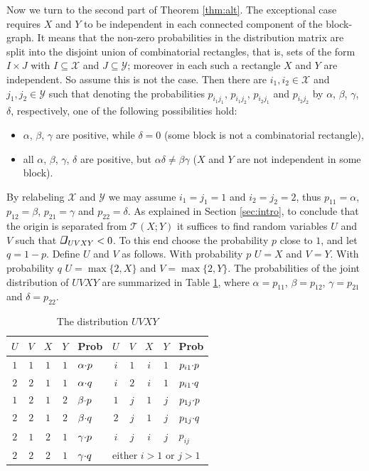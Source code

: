 \documentclass{IEEEtran}
\newcommand\T{\mathcal{T}}
\newcommand\ing{\begin{tikzpicture}[scale=0.13\ht\strutbox]%
        \draw[line width=0.015cm](0,0)--(0.055,0.22)--(0.22,0.22);
        \draw[line width=0.035cm](0.22,0.22)--(0.165,0);
        \draw[line width=0.025cm](0.165,0)--(0,0);
   \end{tikzpicture}}
\begin{document}
\medskip 
Now we turn to the second part of Theorem \ref{thm:alt}. The exceptional
case requires $X$ and $Y$ to be independent in each connected component of
the block-graph. It means that the non-zero probabilities in the
distribution matrix are split into the disjoint union of combinatorial
rectangles, that is, sets of the form $I \times J$ with $I\subseteq \mathcal
X$ and $J \subseteq \mathcal Y$; moreover in each such a rectangle $X$ and
$Y$ are independent. So assume this is not the case. Then there are
$i_1,i_2\in\mathcal X$ and $j_1,j_2\in\mathcal Y$ such that denoting the
probabilities $p_{i_1j_1}$, $p_{i_1j_2}$, $p_{i_2j_1}$ and $p_{i_2j_2}$ by
$\alpha$, $\beta$, $\gamma$, $\delta$, respectively, one of the following
possibilities hold:
\begin{itemize}
\item[(i)] $\alpha$, $\beta$, $\gamma$ are positive, while $\delta=0$
   (some block is not a combinatorial rectangle),
\item[(ii)] all $\alpha$, $\beta$, $\gamma$, $\delta$  are positive, but 
   $\alpha\delta \neq \beta\gamma$ ($X$ and $Y$ are not independent in 
   some block).
\end{itemize}

By relabeling $\mathcal X$ and $\mathcal Y$ we may assume $i_1=j_1=1$ and
$i_2=j_2=2$, thus $p_{11}=\alpha$, $p_{12}=\beta$, $p_{21}=\gamma$ and
$p_{22}=\delta$. As explained in Section \ref{sec:intro}, to conclude that
the origin is separated from $\T(X;Y)$ it suffices to find random variables $U$ and
$V$ such that $\ing_{UVXY}<0$. To this end choose the probability $p$ close
to $1$, and let $q=1-p$. Define $U$ and $V$ as follows. With probability $p$
$U=X$ and $V=Y$. With probability $q$ $U=\max\{2,X\}$ and
$V=\max\{2,Y\}$.
The probabilities of the joint distribution of $UVXY$ are summarized in
Table \ref{table:dist}, where $\alpha=p_{11}$, $\beta=p_{12}$,
$\gamma=p_{21}$ and $\delta=p_{22}$.

\begin{table}[htb]
\begin{center}
\begin{tabular}{@{}|c@{}c@{}c@{}cl@{\quad}|@{\quad}c@{}c@{}c@{}cl|}
\hline\rule{0pt}{11pt}%
$U$&$ V$&$ X$&$ Y$& Prob &%
$U$&$ V$&$ X$&$ Y$& Prob \\
\hline\rule{0pt}{11pt}%
$1$&$1$&$1$&$1$ & $\alpha{\cdot} p$ & $i$&$1$&$i$&$1$ & $p_{i1}{\cdot} p$\\
$2$&$2$&$1$&$1$ & $\alpha{\cdot} q$  & $i$&$2$&$i$&$1$ & $p_{i1}{\cdot} q$\\
$1$&$2$&$1$&$2$ & $\beta{\cdot} p$  & $1$&$j$&$1$&$j$ & $p_{1j}{\cdot} p$\\
$2$&$2$&$1$&$2$ & $\beta{\cdot} q$ & $2$&$j$&$1$&$j$ & $p_{1j}{\cdot} q$\\
$2$&$1$&$2$&$1$ & $\gamma{\cdot} p$&$i$&$j$&$i$&$j$ & $p_{ij}$\\
$2$&$2$&$2$&$1$ & $\gamma{\cdot} q$&
 \multicolumn{5}{l|}{\hspace{-0.6em}\footnotesize either $i>1$ or $j>1$}\\[2pt]
\hline
\end{tabular}\end{center}
\caption{The distribution $UVXY$}\label{table:dist}
\end{table}
\end{document}
